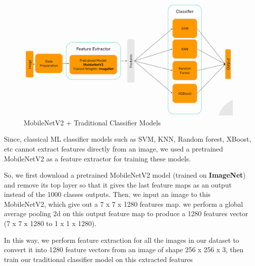 \begin{figure}
    \centering
    \includegraphics[width=1\linewidth]{graphics//chapter5/mobilentV2 + ML.png}
    \caption{MobileNetV2 + Traditional Classifier Models}
    \label{fig:mobilenetv2-all}
\end{figure}

    Since, classical ML classifier models such as SVM, KNN, Random forest, XBoost, etc cannot extract features directly from an image, we used a pretrained MobileNetV2 as a feature extractor for training these models.\par\vspace{1em}

    So, we first download a pretrained MobileNetV2 model (trained on \textbf{ImageNet}) and remove its top layer so that it gives the last feature maps as an output instead of the 1000 classes outputs. 
    Then, we input an image to this MobileNetV2, which give out a 7 x 7 x 1280 features map. we perform a global average pooling 2d on this output feature map to produce a 1280 features vector (7 x 7 x 1280 to 1 x 1 x 1280). \par\vspace{1em}
    In this way, we perform feature extraction for all the images in our dataset to convert it into 1280 feature vectors from an image of shape 256 x 256 x 3, then train our traditional classifier model on this extracted features
\FloatBarrier

